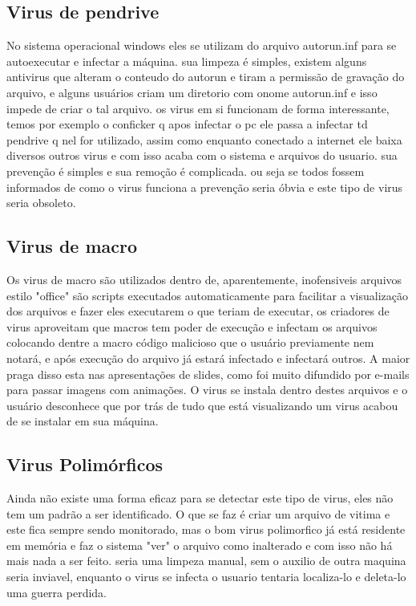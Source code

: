 \subsection{Virus de pendrive}
No sistema operacional windows eles se utilizam do arquivo autorun.inf para se autoexecutar e infectar a máquina. sua limpeza é simples, existem alguns antivirus que alteram o conteudo do autorun e tiram a permissão de gravação do arquivo, e alguns usuários criam um diretorio com onome autorun.inf e isso impede de criar o tal arquivo. os virus em si funcionam de forma interessante, temos por exemplo o conficker q apos infectar o pc ele passa a infectar td pendrive q nel for utilizado, assim como enquanto conectado a internet ele baixa diversos outros virus e com isso acaba com o sistema e arquivos do usuario. sua prevenção é simples e sua remoção é complicada. ou seja se todos fossem informados de como o virus funciona a prevenção seria óbvia e este tipo de virus seria obsoleto.

\subsection{Virus de macro}
Os virus de macro são utilizados dentro de, aparentemente, inofensiveis arquivos estilo "office" são scripts executados automaticamente para facilitar a visualização dos arquivos e fazer eles executarem o que teriam de executar, os criadores de virus aproveitam que macros tem poder de execução e infectam os arquivos colocando dentre a macro código malicioso que o usuário previamente nem notará, e após execução do arquivo já estará infectado e infectará outros. A maior praga disso esta nas apresentações de slides, como foi muito difundido por e-mails para passar imagens com animações. O virus se instala dentro destes arquivos e o usuário desconhece que por trás de tudo que está visualizando um virus acabou de se instalar em sua máquina.
\subsection{Virus Polimórficos}
Ainda não existe uma forma eficaz para se detectar este tipo de virus, eles não tem um padrão a ser identificado. O que se faz é criar um arquivo de vitima e este fica sempre sendo monitorado, mas o bom virus polimorfico já está residente em memória e faz o sistema "ver" o arquivo como inalterado e com isso não há mais nada a ser feito. seria uma limpeza manual, sem o auxilio de outra maquina seria inviavel, enquanto o virus se infecta o usuario tentaria localiza-lo e deleta-lo uma guerra perdida.

